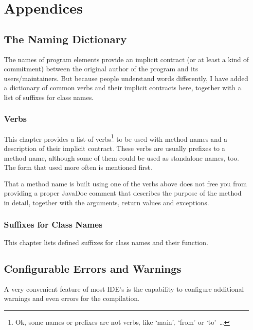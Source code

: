 \documentclass[11pt,a4paper, titlepage, parskip=half, headsepline, footsepline, cleardoublepage=current, headheight=1cm]{scrbook}
\begin{document}


\chapter{Appendices}

\section{The Naming Dictionary}\label{sec:TheNamingDictionary}
The names of program elements provide an implicit contract (or at least a kind of commitment) between the original author of the program and its users/maintainers. But because people understand words differently, I have added a dictionary of common verbs and their implicit contracts here, together with a list of suffixes for class names.

\subsection{Verbs}
This chapter provides a list of verbs\footnote{Ok, some names or prefixes are not verbs, like ‘main’, ‘from’ or ‘to’~…} to be used with method names and a description of their implicit contract. These verbs are usually prefixes to a method name, although some of them could be used as standalone names, too. The form that used more often is mentioned first.

\renewcommand{\cellalign}{tl}

That a method name is built using one of the verbs above does not free you from providing a proper JavaDoc comment that describes the purpose of the method in detail, together with the arguments, return values and exceptions.

\subsection{Suffixes for Class Names}\label{sec:SuffixesForClassNames}
This chapter lists defined suffixes for class names and their function.

\renewcommand{\cellalign}{tl}

\section{Configurable Errors and Warnings}\label{sec:ConfigurableErrorsAndWarnings}
A very convenient feature of most IDE's is the capability to configure additional warnings and even errors for the compilation.
\end{document}
